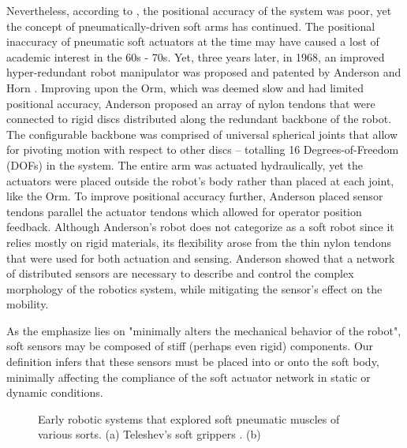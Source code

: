 Nevertheless, according to \cite{}, the positional accuracy of the system was poor, yet the concept of pneumatically-driven soft arms has continued. The positional inaccuracy of pneumatic soft actuators at the time may have caused a lost of academic interest in the 60s - 70s. Yet, three years later, in 1968, an improved hyper-redundant robot manipulator was proposed and patented by Anderson and Horn \cite{Anderson1968}.  Improving upon the Orm, which was deemed slow and had limited positional accuracy, Anderson proposed an array of nylon tendons that were connected to rigid discs distributed along the redundant backbone of the robot. The configurable backbone was comprised of universal spherical joints that allow for pivoting motion with respect to other discs -- totalling 16 Degrees-of-Freedom (DOFs) in the system. The entire arm was actuated hydraulically, yet the actuators were placed outside the robot's body rather than placed at each joint, like the Orm. To improve positional accuracy further, Anderson placed sensor tendons parallel the actuator tendons which allowed for operator position feedback. Although Anderson's robot does not categorize as a soft robot since it relies mostly on rigid materials, its flexibility arose from the thin nylon tendons that were used for both actuation and sensing. Anderson showed that a network of distributed sensors are necessary to describe and control the complex morphology of the robotics system, while mitigating the sensor's effect on the mobility.

%
\begin{rmk}
  \vspace{-5mm}
As the emphasize lies on "minimally alters the mechanical behavior of the robot", soft sensors may be composed of stiff (perhaps even rigid) components. Our definition infers that these sensors must be placed into or onto the soft body, minimally affecting the compliance of the soft actuator network in static or dynamic conditions.
\end{rmk}


\begin{figure}[!t]
  \ifx\printFigures\undefined
  \else
  \centering
  
  \fi
  \caption{Early robotic systems that explored soft pneumatic muscles of various sorts. (a) Teleshev's soft grippers \cite{Teleshev}. (b)   \label{fig:C0:earlyPAMrobots}}
\end{figure}


